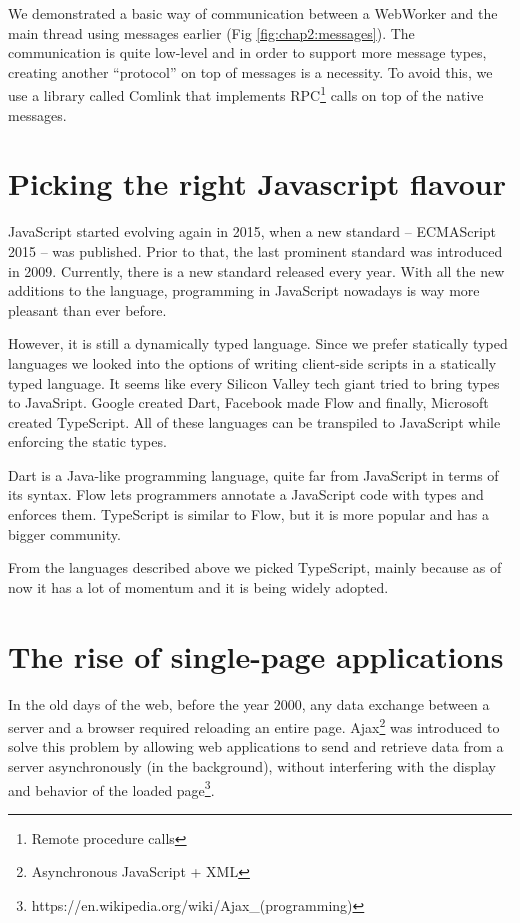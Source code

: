 We demonstrated a basic way of communication between a WebWorker and the main thread using messages earlier (Fig \ref{fig:chap2:messages}). The communication is
quite low-level and in order to support more message types, creating another ``protocol'' on top of messages is a necessity. To avoid this, we use
a library called Comlink \cite{Comlink} that implements RPC\footnote{Remote procedure calls} calls on top of the native messages.

\section{Picking the right Javascript flavour}
JavaScript started evolving again in 2015, when a new standard -- ECMAScript 2015 -- was published. Prior to that, the last prominent
standard was introduced in 2009. Currently, there is a new standard released every year. With all the new additions to the language, programming in
JavaScript nowadays is way more pleasant than ever before.

However, it is still a dynamically typed language. Since we prefer statically typed languages we looked into the options of writing client-side scripts in
a statically typed language. It seems like every Silicon Valley tech giant tried to bring types to JavaSript. Google created Dart,
Facebook made Flow and finally, Microsoft created TypeScript. All of these languages can be transpiled to JavaScript while enforcing the static types.

Dart is a Java-like programming language, quite far from JavaScript in terms of its syntax. Flow lets programmers
annotate a JavaScript code with types and enforces them. TypeScript is similar to Flow, but it is more popular and has a bigger community.

From the languages described above we picked TypeScript, mainly because as of now it has a lot of momentum and it is being widely adopted.

\section{The rise of single-page applications}
\label{chap2:spa}
In the old days of the web, before the year 2000, any data exchange between a server and a browser required reloading an entire page. 
Ajax\footnote{Asynchronous JavaScript + XML} was introduced to solve this problem by allowing web applications to send and retrieve data from
a server asynchronously (in the background), without interfering with the display and behavior of the loaded
page\footnote{https://en.wikipedia.org/wiki/Ajax\_(programming)}.

